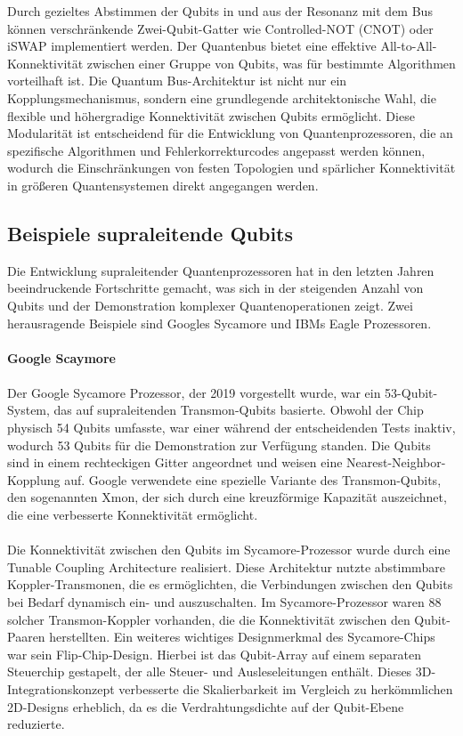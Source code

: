 Durch gezieltes Abstimmen der Qubits in und aus der Resonanz mit dem Bus können verschränkende Zwei-Qubit-Gatter wie Controlled-NOT (CNOT) oder iSWAP implementiert werden. Der Quantenbus bietet eine effektive All-to-All-Konnektivität zwischen einer Gruppe von Qubits, was für bestimmte Algorithmen vorteilhaft ist. Die \grqq Quantum Bus\grqq{}-Architektur ist nicht nur ein Kopplungsmechanismus, sondern eine grundlegende architektonische Wahl, die flexible und höhergradige Konnektivität zwischen Qubits ermöglicht. Diese Modularität ist entscheidend für die Entwicklung von Quantenprozessoren, die an spezifische Algorithmen und Fehlerkorrekturcodes angepasst werden können, wodurch die Einschränkungen von festen Topologien und spärlicher Konnektivität in größeren Quantensystemen direkt angegangen werden.

\subsection{Beispiele supraleitende Qubits}
Die Entwicklung supraleitender Quantenprozessoren hat in den letzten Jahren beeindruckende Fortschritte gemacht, was sich in der steigenden Anzahl von Qubits und der Demonstration komplexer Quantenoperationen zeigt. Zwei herausragende Beispiele sind Googles Sycamore und IBMs Eagle Prozessoren.
\\\\
\textbf{Google Scaymore}\\\\
Der Google Sycamore Prozessor, der 2019 vorgestellt wurde, war ein 53-Qubit-System, das auf supraleitenden Transmon-Qubits basierte. Obwohl der Chip physisch 54 Qubits umfasste, war einer während der entscheidenden Tests inaktiv, wodurch 53 Qubits für die Demonstration zur Verfügung standen. Die Qubits sind in einem rechteckigen Gitter angeordnet und weisen eine Nearest-Neighbor-Kopplung auf. Google verwendete eine spezielle Variante des Transmon-Qubits, den sogenannten Xmon, der sich durch eine kreuzförmige Kapazität auszeichnet, die eine verbesserte Konnektivität ermöglicht.\\\\
Die Konnektivität zwischen den Qubits im Sycamore-Prozessor wurde durch eine \grqq Tunable Coupling Architecture\grqq{} realisiert. Diese Architektur nutzte abstimmbare Koppler-Transmonen, die es ermöglichten, die Verbindungen zwischen den Qubits bei Bedarf dynamisch \grqq ein- und auszuschalten\grqq{}. Im Sycamore-Prozessor waren 88 solcher Transmon-Koppler vorhanden, die die Konnektivität zwischen den Qubit-Paaren herstellten. Ein weiteres wichtiges Designmerkmal des Sycamore-Chips war sein \grqq Flip-Chip\grqq{}-Design. Hierbei ist das Qubit-Array auf einem separaten Steuerchip gestapelt, der alle Steuer- und Ausleseleitungen enthält. Dieses 3D-Integrationskonzept verbesserte die Skalierbarkeit im Vergleich zu herkömmlichen 2D-Designs erheblich, da es die Verdrahtungsdichte auf der Qubit-Ebene reduzierte.\\\\
